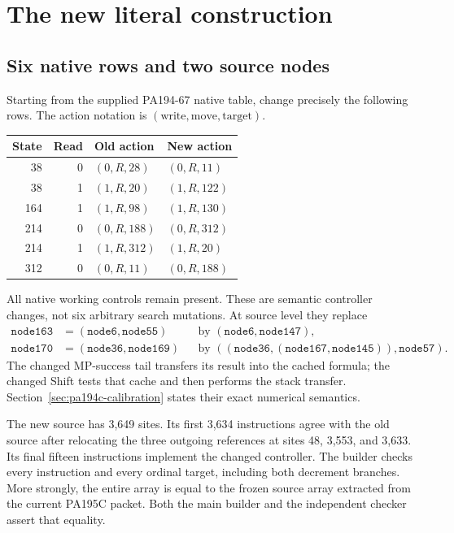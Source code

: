 \documentclass[11pt,letterpaper]{article}
\begin{document}
\section{The new literal construction}
\label{sec:construction}

\subsection{Six native rows and two source nodes}

Starting from the supplied PA194-67 native table, change precisely the
following rows. The action notation is $(\text{write},\text{move},\text{target})$.
\begin{center}
\begin{tabular}{@{}rrll@{}}
\toprule
State & Read & Old action & New action\\
\midrule
38&0&$(0,R,28)$&$(0,R,11)$\\
38&1&$(1,R,20)$&$(1,R,122)$\\
164&1&$(1,R,98)$&$(1,R,130)$\\
214&0&$(0,R,188)$&$(0,R,312)$\\
214&1&$(1,R,312)$&$(1,R,20)$\\
312&0&$(0,R,11)$&$(0,R,188)$\\
\bottomrule
\end{tabular}
\end{center}
All native working controls remain present. These are semantic controller
changes, not six arbitrary search mutations. At source level they replace
\begin{align*}
 \texttt{node163}&=(\texttt{node6},\texttt{node55})
       &&\text{by }(\texttt{node6},\texttt{node147}),\\
 \texttt{node170}&=(\texttt{node36},\texttt{node169})
       &&\text{by }((\texttt{node36},(\texttt{node167},\texttt{node145})),
                       \texttt{node57}).
\end{align*}
The changed MP-success tail transfers its result into the cached formula;
the changed Shift tests that cache and then performs the stack transfer.
Section~\ref{sec:pa194c-calibration} states their exact numerical semantics.

The new source has 3,649 sites. Its first 3,634 instructions agree with
the old source after relocating the three outgoing references at sites
48, 3,553, and 3,633. Its final fifteen instructions implement the changed
controller. The builder checks every instruction and every ordinal target,
including both decrement branches. More strongly, the entire array is
equal to the frozen source array extracted from the current PA195C packet.
Both the main builder and the independent checker assert that equality.
\end{document}
